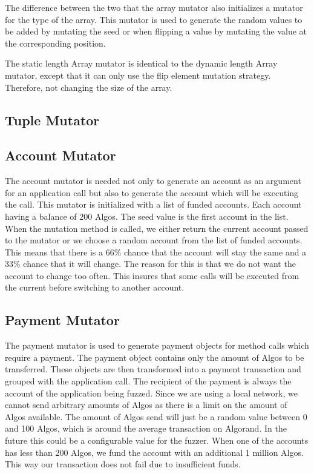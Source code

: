 The difference between the two that the array mutator also initializes a mutator for the type of the array.
This mutator is used to generate the random values to be added by mutating the seed or when flipping a value by mutating the value at the corresponding position.

The static length Array mutator is identical to the dynamic length Array mutator, except that it can only use the flip element mutation strategy.
Therefore, not changing the size of the array.

\subsection*{Tuple Mutator}

\subsection*{Account Mutator}
The account mutator is needed not only to generate an account as an argument for an application call but also to generate the account which will be executing the call.
This mutator is initialized with a list of funded accounts.
Each account having a balance of 200 Algos.
The seed value is the first account in the list.
When the mutation method is called, we either return the current account passed to the mutator or we choose a random account from the list of funded accounts.
This means that there is a 66\% chance that the account will stay the same and a 33\% chance that it will change.
The reason for this is that we do not want the account to change too often.
This insures that some calls will be executed from the current before switching to another account.

\subsection*{Payment Mutator}
The payment mutator is used to generate payment objects for method calls which require a payment.
The payment object contains only the amount of Algos to be transferred.
These objects are then transformed into a payment transaction and grouped with the application call.
The recipient of the payment is always the account of the application being fuzzed.
Since we are using a local network, we cannot send arbitrary amounts of Algos as there is a limit on the amount of Algos available.
The amount of Algos send will just be a random value between 0 and 100 Algos, which is around the average transaction on Algorand.
In the future this could be a configurable value for the fuzzer.
When one of the accounts has less than 200 Algos, we fund the account with an additional 1 million Algos.
This way our transaction does not fail due to insufficient funds.


